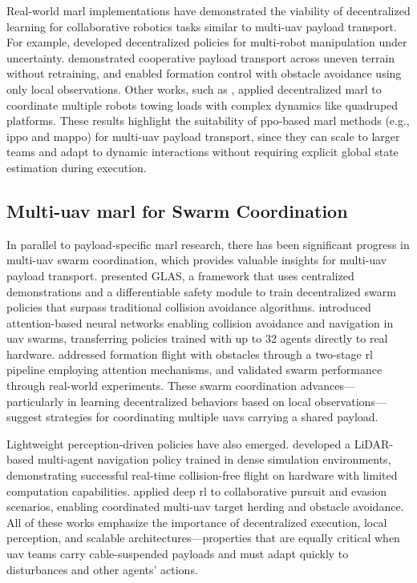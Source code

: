 Real-world \gls{marl} implementations have demonstrated the viability of decentralized learning for collaborative robotics tasks similar to multi-\gls{uav} payload transport. For example, \cite{Chen2022TowardsHBA} developed decentralized policies for multi-robot manipulation under uncertainty. \cite{Pandit2024LearningDM} demonstrated cooperative payload transport across uneven terrain without retraining, and \cite{Ji2021ReinforcementLF} enabled formation control with obstacle avoidance using only local observations. Other works, such as \cite{Chen2025DecentralizedNO}, applied decentralized \gls{marl} to coordinate multiple robots towing loads with complex dynamics like quadruped platforms. These results highlight the suitability of \gls{ppo}-based \gls{marl} methods (e.g., \gls{ippo} and \gls{mappo}) for multi-\gls{uav} payload transport, since they can scale to larger teams and adapt to dynamic interactions without requiring explicit global state estimation during execution.

\subsection{Multi-\gls{uav} \gls{marl} for Swarm Coordination}
In parallel to payload-specific \gls{marl} research, there has been significant progress in multi-\gls{uav} swarm coordination, which provides valuable insights for multi-\gls{uav} payload transport. \cite{riviere_glas_2020} presented GLAS, a framework that uses centralized demonstrations and a differentiable safety module to train decentralized swarm policies that surpass traditional collision avoidance algorithms. \cite{huang_collision_2024} introduced attention-based neural networks enabling collision avoidance and navigation in \gls{uav} swarms, transferring policies trained with up to 32 agents directly to real hardware. \cite{xie_multi-uav_2024} addressed formation flight with obstacles through a two-stage \gls{rl} pipeline employing attention mechanisms, and validated swarm performance through real-world experiments. These swarm coordination advances—particularly in learning decentralized behaviors based on local observations—suggest strategies for coordinating multiple \gls{uav}s carrying a shared payload.

Lightweight perception-driven policies have also emerged. \cite{diao_efficient_2024} developed a LiDAR-based multi-agent navigation policy trained in dense simulation environments, demonstrating successful real-time collision-free flight on hardware with limited computation capabilities. \cite{zhao_deep_2024} applied deep \gls{rl} to collaborative pursuit and evasion scenarios, enabling coordinated multi-\gls{uav} target herding and obstacle avoidance. All of these works emphasize the importance of decentralized execution, local perception, and scalable architectures—properties that are equally critical when \gls{uav} teams carry cable-suspended payloads and must adapt quickly to disturbances and other agents' actions.

